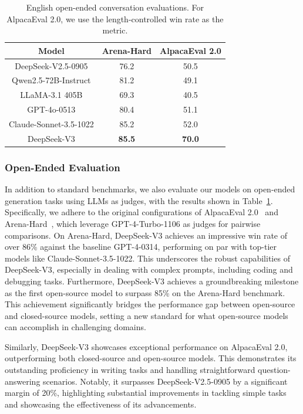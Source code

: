 \documentclass[11pt, a4paper, logo, copyright, nonumbering]{deepseek}
\newcommand{\dsviii}{DeepSeek-V3}
\begin{document}
\begin{CJK*}{UTF8}{gbsn}
\begin{table}[t]
    \centering
    \begin{tabular}{c | c c}
    \toprule
    \textbf{Model} & \textbf{Arena-Hard} & \textbf{AlpacaEval 2.0} \\
    \midrule
    DeepSeek-V2.5-0905 & 76.2 & 50.5\\
    Qwen2.5-72B-Instruct & 81.2 & 49.1  \\
    LLaMA-3.1 405B & 69.3 & 40.5\\
    GPT-4o-0513 & 80.4 &  51.1 \\
    Claude-Sonnet-3.5-1022 & 85.2  & 52.0 \\
    DeepSeek-V3 & \textbf{85.5} & \textbf{70.0} \\
    \bottomrule
    \end{tabular}
    \caption{
    English open-ended conversation evaluations. 
    For AlpacaEval 2.0, we use the length-controlled win rate as the metric. 
    }
    \label{tab:open} 
\end{table}

\subsubsection{Open-Ended Evaluation}

In addition to standard benchmarks, we also evaluate our models on open-ended generation tasks using LLMs as judges, with the results shown in Table~\ref{tab:open}. 
Specifically, we adhere to the original configurations of AlpacaEval 2.0~\citep{alpaca2.0} and Arena-Hard~\citep{li2024crowdsourced}, which leverage GPT-4-Turbo-1106 as judges for pairwise comparisons. 
On Arena-Hard, \dsviii{} achieves an impressive win rate of over 86\% against the baseline GPT-4-0314, performing on par with top-tier models like Claude-Sonnet-3.5-1022. 
This underscores the robust capabilities of \dsviii{}, especially in dealing with complex prompts, including coding and debugging tasks. 
Furthermore, \dsviii{} achieves a groundbreaking milestone as the first open-source model to surpass 85\% on the Arena-Hard benchmark. 
This achievement significantly bridges the performance gap between open-source and closed-source models, setting a new standard for what open-source models can accomplish in challenging domains.

Similarly, \dsviii{} showcases exceptional performance on AlpacaEval 2.0, outperforming both closed-source and open-source models. 
This demonstrates its outstanding proficiency in writing tasks and handling straightforward question-answering scenarios. 
Notably, it surpasses DeepSeek-V2.5-0905 by a significant margin of 20\%, highlighting substantial improvements in tackling simple tasks and showcasing the effectiveness of its advancements.


\end{CJK*}
\end{document}
